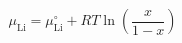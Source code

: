 \documentclass[preview]{standalone}
\begin{document}
\[\mu_\text{Li} = \mu_\text{Li}^\circ + RT \ln\left(\frac{x}{1-x}\right)\]
\end{document}
